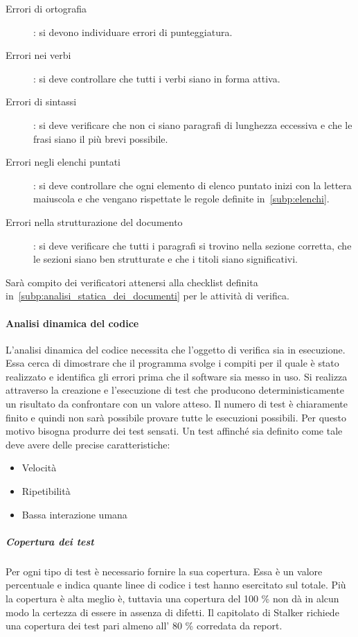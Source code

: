 \documentclass[../norme-di-progetto.tex]{subfiles}
\begin{document}
\begin{description}
    \item [Errori di ortografia]: si devono individuare errori di punteggiatura.
    \item [Errori nei verbi]: si deve controllare che tutti i verbi siano in forma attiva.
    \item [Errori di sintassi]: si deve verificare che non ci siano paragrafi di lunghezza eccessiva e che le frasi siano il più brevi possibile.
    \item [Errori negli elenchi puntati]: si deve controllare che ogni elemento di elenco puntato inizi con la lettera maiuscola e che vengano rispettate le regole definite in~\ref{subp:elenchi}.
    \item [Errori nella strutturazione del documento]: si deve verificare che tutti i paragrafi si trovino nella sezione corretta, che le sezioni siano ben strutturate e che i titoli siano significativi.
\end{description}

Sarà compito dei verificatori attenersi alla checklist definita in~\ref{subp:analisi_statica_dei_documenti} per le attività di verifica.

\paragraph{Analisi dinamica del codice}%
\label{par:analisi_dinamica_del_codice}
L'analisi dinamica del codice necessita che l'oggetto di verifica sia in esecuzione.
Essa cerca di dimostrare che il programma svolge i compiti per il quale è stato realizzato e identifica gli errori prima che il software sia messo in uso.
Si realizza attraverso la creazione e l'esecuzione di test che producono deterministicamente un risultato da confrontare con un valore atteso.
Il numero di test è chiaramente finito e quindi non sarà possibile provare tutte le esecuzioni possibili.
Per questo motivo bisogna produrre dei test sensati.
Un test affinché sia definito come tale deve avere delle precise caratteristiche:

\begin{itemize}
  \item Velocità
  \item Ripetibilità
  \item Bassa interazione umana
\end{itemize}

\subparagraph{Copertura dei test}%
\label{subp:copertura_dei_test}
Per ogni tipo di test è necessario fornire la sua copertura.
Essa è un valore percentuale e indica quante linee di codice i test hanno esercitato sul totale.
Più la copertura è alta meglio è, tuttavia una copertura del 100 \% non dà in alcun modo la certezza di essere in assenza di difetti.
Il capitolato di Stalker richiede una copertura dei test pari almeno all' 80 \% corredata da report.
\end{document}
